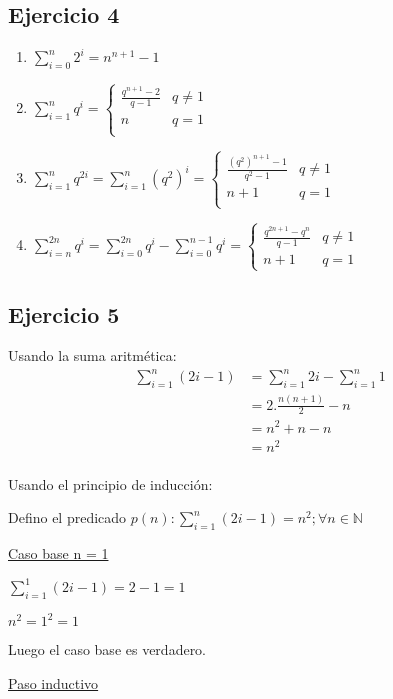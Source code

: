 \subsection{Ejercicio 4}
\begin{enumerate}[label=(\alph*)]
    \item $\sum_{i=0}^{n}2^i = n^{n+1}-1$
    \item $\sum_{i=1}^{n}q^i = \begin{cases}
        \frac{q^{n+1}-2}{q-1} & q \neq 1 \\
        n & q = 1 \\
    \end{cases}$
    \item $\sum_{i=1}^{n}q^{2i} = \sum_{i=1}^{n}(q^2)^i =  \begin{cases}
        \frac{(q^2)^{n+1}-1}{q^2-1} & q \neq 1 \\
        n+1 & q = 1 \\
    \end{cases}$
    \item $\sum_{i=n}^{2n}q^{i} = \sum_{i=0}^{2n}q^{i} - \sum_{i=0}^{n-1}q^{i} = \begin{cases}
        \frac{q^{2n+1} - q^n}{q-1} & q \neq 1 \\
        n+1 & q =1
    \end{cases}$
\end{enumerate}

\subsection{Ejercicio 5}
Usando la suma aritmética:
\begin{align*}
    \sum_{i=1}^{n}(2i-1) &= \sum_{i=1}^{n}2i - \sum_{i=1}^{n}1 \\
    &= 2.\frac{n(n+1)}{2} - n \\
    &= n^2 + n - n \\
    &= n^2\\
\end{align*}

Usando el principio de inducción:

Defino el predicado $p(n): \sum_{i=1}^{n}(2i-1) = n^2; \forall n \in \mathbb{N}$

\underline{Caso base n = 1}

$\sum_{i=1}^{1}(2i-1) = 2 - 1 = 1$

$n^2 = 1^2 = 1$

Luego el caso base es verdadero.

\underline{Paso inductivo}

